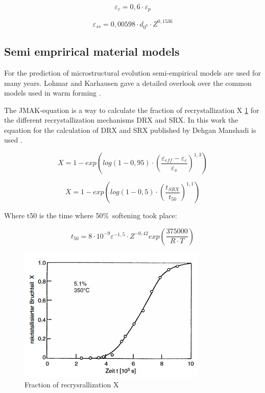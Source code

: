 \begin{equation}
 \varepsilon_{c} = 0,6\cdot\varepsilon_{p}
\end{equation}

\begin{equation}
 \varepsilon_{ss} = 0,00598\cdot d_{0^{0}}\cdot Z^{0,1536}
\end{equation}

\subsection{Semi emprirical material models}
For the prediction of microstructural evolution semi-empirical models are used for many years. Lohmar and Karhausen gave a detailed overlook over the common models used in warm forming \cite{LOH10}\cite{KAR94}.\par 

The JMAK-equation is a way to calculate the fraction of recrystallization X \ref{img:JMAK} for the different recrystallization mechanisms DRX and SRX. In this work the equation for the calculation of DRX and SRX published by Dehgan Manshadi is used \cite{DEG08}.

\begin{equation}
 X = 1 - exp\left( log\left( 1-0,95\right) \cdot\left( \frac{\varepsilon_{eff}-\varepsilon_{c}}{\varepsilon_{x}}\right) ^{1,3}\right)
\end{equation}

\begin{equation}
 X = 1 - exp\left( log\left( 1-0,5\right) \cdot\left( \frac{t_{SRX}}{t_{50}}\right) ^{1,1}\right)
\end{equation}

Where t50 is the time where 50\%\ softening took place:

\begin{equation}
 t_50 = 8\cdot10^{-9}\varepsilon^{-1,5}\cdot Z^{-0,42}exp\left( \frac{375000}{R\cdot T}\right)
\end{equation}

\begin{figure}[htbp]
 \centering
 \includegraphics[width=0.8\textwidth]{images/JMAK}
 \caption{Fraction of recrysrallization X \cite{GOT07}}
 \label{img:JMAK}
\end{figure}

